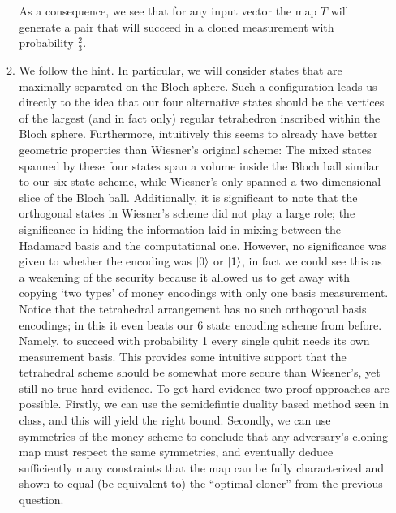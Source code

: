 \documentclass[12pt]{article}
\begin{document}
\begin{enumerate}
\begin{enumerate}
As a consequence, we see that for any input vector the map $T$ will generate a pair that will succeed in a cloned measurement with probability $\frac{2}{3}$.
\item We follow the hint. In particular, we will consider states that are maximally separated on the Bloch sphere. Such a configuration leads us directly to the idea that our four alternative states should be the vertices of the largest (and in fact only) regular tetrahedron inscribed within the Bloch sphere. Furthermore, intuitively this seems to already have better geometric properties than Wiesner's original scheme: The mixed states spanned by these four states span a volume inside the Bloch ball similar to our six state scheme, while Wiesner's only spanned a two dimensional slice of the Bloch ball. Additionally, it is significant to note that the orthogonal states in Wiesner's scheme did not play a large role; the significance in hiding the information laid in mixing between the Hadamard basis and the computational one. However, no significance was given to whether the encoding was $\ket{0}$ or $\ket{1}$, in fact we could see this as a weakening of the security because it allowed us to get away with copying `two types' of money encodings with only one basis measurement. Notice that the tetrahedral arrangement has no such orthogonal basis encodings; in this it even beats our 6 state encoding scheme from before. Namely, to succeed with probability 1 every single qubit needs its own measurement basis. This provides some intuitive support that the tetrahedral scheme should be somewhat more secure than Wiesner's, yet still no true hard evidence. To get hard evidence two proof approaches are possible. Firstly, we can use the semidefintie duality based method seen in class, and this will yield the right bound. Secondly, we can use symmetries of the money scheme to conclude that any adversary's cloning map must respect the same symmetries, and eventually deduce sufficiently many constraints that the map can be fully characterized and shown to equal (be equivalent to) the ``optimal cloner'' from the previous question. 
\end{enumerate}
\end{enumerate}
\end{document}
